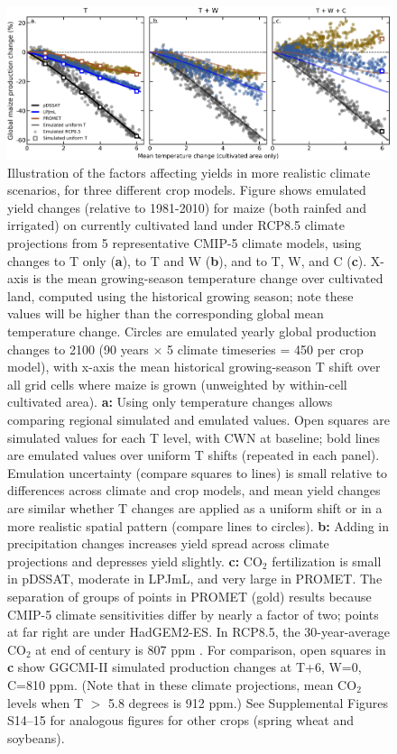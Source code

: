 \documentclass[gmdd]{copernicus} %
\begin{document}
\begin{figure}[ht]
    \centering
    \includegraphics[width = 16.3cm]{figures/global_em_maize.png}
    \caption{
    Illustration of the factors affecting yields in more realistic climate scenarios, for three different crop models. 
	Figure shows emulated yield changes (relative to 1981-2010) for maize (both rainfed and irrigated) on currently cultivated land under RCP8.5 climate projections from 5 representative CMIP-5 climate models, using changes to T only (\textbf{a}), to T and W (\textbf{b}), and to T, W, and C (\textbf{c}).  X-axis is the mean growing-season temperature change over cultivated land, computed using the historical growing season; note these values will be higher than the corresponding global mean temperature change.
    Circles are emulated yearly global production changes to 2100 (90 years $\times$ 5 climate timeseries = 450 per crop model), with x-axis the mean historical growing-season T shift over all grid cells where maize is grown (unweighted by within-cell cultivated area).
    \textbf{a:} Using only temperature changes allows comparing regional simulated and emulated values. Open squares are simulated values for each T level, with CWN at baseline; bold lines are emulated values over uniform T shifts (repeated in each panel). Emulation uncertainty (compare squares to lines) is small relative to differences across climate and crop models, and 
    mean yield changes are similar whether T changes are applied as a uniform shift or in a more realistic spatial pattern (compare lines to circles). 
    \textbf{b:} Adding in precipitation changes increases yield spread across climate projections and depresses yield slightly. 
    \textbf{c:}  CO$_2$ fertilization is small in pDSSAT, moderate in LPJmL, and very large in PROMET. 
    The separation of groups of points in PROMET (gold) results because CMIP-5 climate sensitivities differ by nearly a factor of two; points at far right are under HadGEM2-ES.
    In RCP8.5, the 30-year-average CO$_2$ at end of century is 807 ppm \citep{riahi2011rcp}. 
	For comparison, open squares in \textbf{c} show GGCMI-II simulated production changes at T+6, W=0, C=810 ppm. (Note that  in these climate projections, mean CO$_2$ levels when T $>$ 5.8 degrees is 912 ppm.)
	See Supplemental Figures S14--15 for analogous figures for other crops (spring wheat and soybeans).
    }
    \label{fig:globe_em}
\end{figure}
\end{document}
